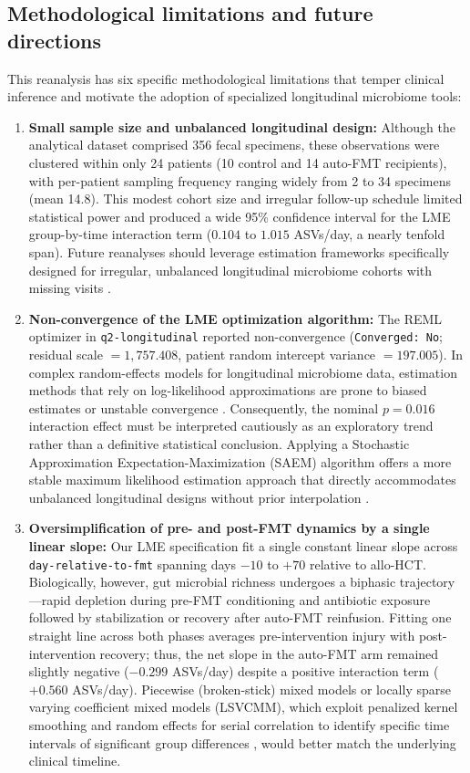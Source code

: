 \subsection{Methodological limitations and future directions}
This reanalysis has six specific methodological limitations that temper clinical inference and motivate the adoption of specialized longitudinal microbiome tools:

\begin{enumerate}
  \item \textbf{Small sample size and unbalanced longitudinal design:} Although the analytical dataset comprised 356 fecal specimens, these observations were clustered within only 24 patients (10 control and 14 auto-FMT recipients), with per-patient sampling frequency ranging widely from 2 to 34 specimens (mean 14.8). This modest cohort size and irregular follow-up schedule limited statistical power and produced a wide 95\% confidence interval for the LME group-by-time interaction term ($0.104$ to $1.015$ ASVs/day, a nearly tenfold span). Future reanalyses should leverage estimation frameworks specifically designed for irregular, unbalanced longitudinal microbiome cohorts with missing visits \citep{barrera2025stochastic,fontaine2026locally}.
  \item \textbf{Non-convergence of the LME optimization algorithm:} The REML optimizer in \texttt{q2-longitudinal} reported non-convergence (\texttt{Converged: No}; residual scale $= 1,757.408$, patient random intercept variance $= 197.005$). In complex random-effects models for longitudinal microbiome data, estimation methods that rely on log-likelihood approximations are prone to biased estimates or unstable convergence \citep{barrera2025stochastic}. Consequently, the nominal $p = 0.016$ interaction effect must be interpreted cautiously as an exploratory trend rather than a definitive statistical conclusion. Applying a Stochastic Approximation Expectation-Maximization (SAEM) algorithm offers a more stable maximum likelihood estimation approach that directly accommodates unbalanced longitudinal designs without prior interpolation \citep{barrera2025stochastic}.
  \item \textbf{Oversimplification of pre- and post-FMT dynamics by a single linear slope:} Our LME specification fit a single constant linear slope across \texttt{day-relative-to-fmt} spanning days $-10$ to $+70$ relative to allo-HCT. Biologically, however, gut microbial richness undergoes a biphasic trajectory---rapid depletion during pre-FMT conditioning and antibiotic exposure followed by stabilization or recovery after auto-FMT reinfusion. Fitting one straight line across both phases averages pre-intervention injury with post-intervention recovery; thus, the net slope in the auto-FMT arm remained slightly negative ($-0.299$ ASVs/day) despite a positive interaction term ($+0.560$ ASVs/day). Piecewise (broken-stick) mixed models or locally sparse varying coefficient mixed models (LSVCMM), which exploit penalized kernel smoothing and random effects for serial correlation to identify specific time intervals of significant group differences \citep{fontaine2026locally}, would better match the underlying clinical timeline.

\end{enumerate}
